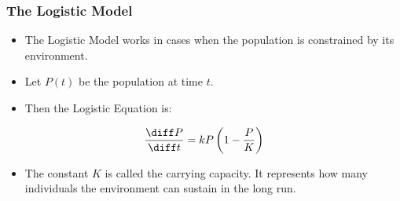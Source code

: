 \begin{frame}
\frametitle{The Logistic Model}
\begin{itemize}
\item  The Logistic Model works in cases when the population is constrained by its environment.
\item  Let $P(t)$ be the population at time $t$.
\item  Then the Logistic Equation is:
\end{itemize}
\[
\frac{\diff P}{\diff t} = kP\left( 1 - \frac{P}{K}\right)
\]
\begin{itemize}
\item  The constant $K$ is called the carrying capacity.  It represents how many individuals the environment can sustain in the long run.
\end{itemize}
\end{frame}
